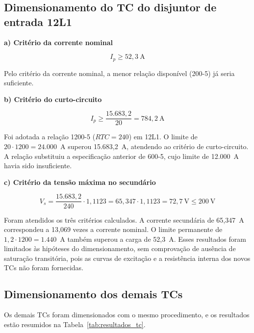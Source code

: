 \subsection{Dimensionamento do TC do disjuntor de entrada 12L1}

\textbf{a) Critério da corrente nominal}

\begin{equation*}
    I_p \geq 52{,}3~\text{A}
\end{equation*}

Pelo critério da corrente nominal, a menor relação disponível (200-5) já seria suficiente.

\textbf{b) Critério do curto-circuito}

\begin{equation*}
    I_p \geq \frac{15.683{,}2}{20} = 784{,}2~\text{A}
\end{equation*}

Foi adotada a relação 1200-5 ($RTC=240$) em 12L1. O limite de $20\cdot1200=24.000$~A superou 15.683,2~A, atendendo ao critério de curto-circuito. A relação substituiu a especificação anterior de 600-5, cujo limite de 12.000~A havia sido insuficiente.

\textbf{c) Critério da tensão máxima no secundário}

\begin{equation*}
    V_s = \frac{15.683{,}2}{240} \cdot 1{,}1123 = 65{,}347 \cdot 1{,}1123 = 72{,}7~\text{V} \leq 200~\text{V}
\end{equation*}

Foram atendidos os três critérios calculados. A corrente secundária de 65,347~A correspondeu a 13,069 vezes a corrente nominal. O limite permanente de $1{,}2\cdot1200=1.440$~A também superou a carga de 52,3~A. Esses resultados foram limitados às hipóteses do dimensionamento, sem comprovação de ausência de saturação transitória, pois as curvas de excitação e a resistência interna dos novos TCs não foram fornecidas.

\subsection{Dimensionamento dos demais TCs}

Os demais TCs foram dimensionados com o mesmo procedimento, e os resultados estão resumidos na Tabela~\ref{tab:resultados_tc}.

